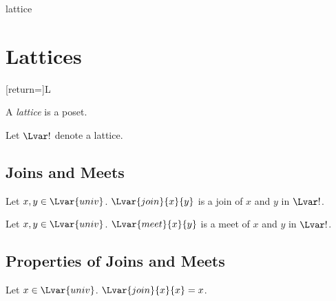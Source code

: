 \documentclass{stex}
\begin{document}
\begin{smodule}{lattice}


  \section{Lattices}
  [return=\lattice]{\mathcal L}

  \begin{forthel}
  \end{forthel}
  
  \begin{forthel}
    \begin{signature}
      A \emph{lattice} is a poset.
    \end{signature}

    Let $\Lvar!$ denote a lattice.
  \end{forthel}
  
  \subsection{Joins and Meets}
  
  \begin{forthel}
    \begin{signature}
      Let $x,y\in\Lvar{univ}$.
      $\Lvar{join}{x}{y}$ is a join of $x$ and $y$ in $\Lvar!$.
    \end{signature}

    \begin{signature}
      Let $x,y\in\Lvar{univ}$.
      $\Lvar{meet}{x}{y}$ is a meet of $x$ and $y$ in $\Lvar!$.
    \end{signature}
  \end{forthel}

  \subsection{Properties of Joins and Meets}

  \begin{forthel}
    \begin{proposition}
      Let $x\in\Lvar{univ}$.
      $\Lvar{join}{x}{x}=x$.
    \end{proposition}


\end{forthel}
\end{smodule}
\end{document}
